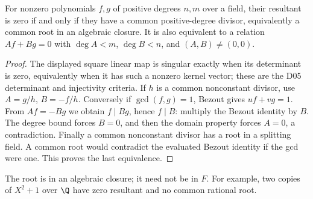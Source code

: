 \begin{theorem}\label{thm:resultant-common-root}
For nonzero polynomials $f,g$ of positive degrees $n,m$ over a field,
their resultant is zero if and only if they have a common
positive-degree divisor, equivalently a common root in an algebraic
closure. It is also equivalent to a relation $Af+Bg=0$ with
$\deg A<m$, $\deg B<n$, and $(A,B)\ne(0,0)$.
\end{theorem}
\begin{proof}
The displayed square linear map is singular exactly when its
determinant is zero, equivalently when it has such a nonzero kernel
vector; these are the D05 determinant and injectivity criteria.
If $h$ is a common nonconstant divisor, use
$A=g/h$, $B=-f/h$. Conversely if $\gcd(f,g)=1$, Bezout gives
$uf+vg=1$. From $Af=-Bg$ we obtain $f\mid Bg$, hence $f\mid B$:
multiply the Bezout identity by $B$. The degree bound forces $B=0$,
and then the domain property forces $A=0$, a contradiction.
Finally a common nonconstant divisor has a root in a splitting
field. A common root would contradict the evaluated Bezout
identity if the gcd were one. This proves the last equivalence.
\end{proof}
The root is in an algebraic closure; it need not be in $F$.
For example, two copies of $X^2+1$ over $\Q$ have zero resultant
and no common rational root.

